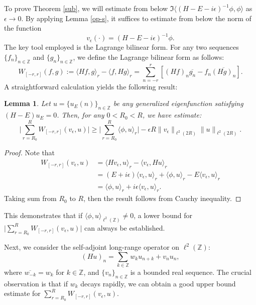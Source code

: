 \documentclass[11pt]{amsart}
\newtheorem{lemma}[theorem]{Lemma}
\theoremstyle{remark}
\theoremstyle{definition}
\begin{document}
To prove Theorem \ref{sub}, we will estimate from below $ \Im \langle (H-E-i\epsilon)^{-1}\phi, \phi \rangle $ as $ \epsilon \to 0 $. By applying Lemma \ref{op-s}, it suffices to estimate from below the norm of the function $$
v_\epsilon(\cdot) = (H-E-i\epsilon)^{-1}\phi.
$$ The key tool employed is the Lagrange bilinear form. For any two sequences $ \{f_n\}_{n\in \mathbb{Z}} $ and $ \{g_n\}_{n\in \mathbb{Z}} $, we define the Lagrange bilinear form as follows: $$
W_{[-r,r]}(f,g) := \langle Hf, g \rangle_r - \langle f, Hg \rangle_r = \sum_{n=-r}^{r} \left[ (Hf)_n \overline{g_n} - f_n \overline{(Hg)_n} \right].
$$ A straightforward calculation yields the following result:

\begin{lemma}\label{lower}
Let \( u = \{u_E(n)\}_{n \in \mathbb{Z}} \) be any generalized eigenfunction satisfying \( (H-E)u_E = 0 \). Then, for any \( 0 < R_0 < R \), 
we have estimate:
$$ \bigg|\sum_{r=R_0}^RW_{[-r,r]}(v_\epsilon, u)\bigg|\geq \bigg|\sum_{r=R_0}^R \langle \phi,u\rangle_r\bigg|- \epsilon R \|v_\epsilon\|_{\ell^2(2R)} \|u\|_{\ell^2(2R)}. $$
\end{lemma}
\begin{proof}
Note that 
$$\begin{aligned}
		W_{[-r,r]}(v_\epsilon, u)&=\langle Hv_\epsilon,u\rangle_r-\langle v_\epsilon,Hu\rangle_r\\
        &=(E+i\epsilon)\langle v_\epsilon,u\rangle_r+\langle \phi,u\rangle_r -E\langle v_\epsilon,u\rangle_r \\
        &= \langle \phi,u\rangle_r+i\epsilon\langle v_\epsilon,u\rangle_r.
	\end{aligned}$$
Taking sum from $R_0$ to $R$, then the result follows from Cauchy inequality. 

\end{proof}

This demonstrates that if $ \langle \phi, u \rangle_{\ell^2(\mathbb{Z})} \neq 0 $, a lower bound for $ \bigg|\sum_{r=R_0}^RW_{[-r,r]}(v_\epsilon, u)\bigg| $ can always be established.

Next, we consider the self-adjoint long-range operator on $ \ell^2(\mathbb{Z}) $: $$
(Hu)_n = \sum_{k \in \mathbb{Z}} w_k u_{n+k} + v_n u_n,
$$ where $ \overline{w_{-k}} = w_k $ for $ k \in \mathbb{Z} $, and $ \{v_n\}_{n \in \mathbb{Z}} $ is a bounded real sequence. The crucial observation is that if $ w_k $ decays rapidly, we can obtain a good upper bound estimate for $ \sum_{r=R_0}^RW_{[-r,r]}(v_\epsilon, u) $.
\end{document}
